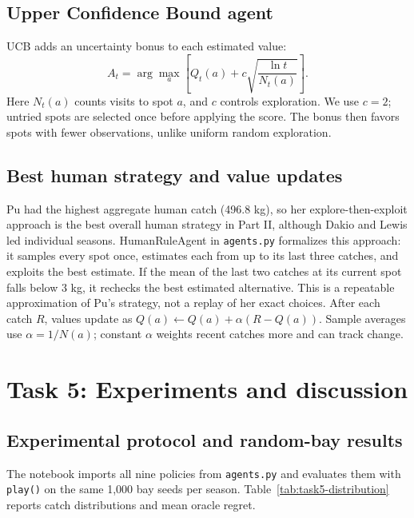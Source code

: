 \documentclass[11pt,a4paper]{article}
\begin{document}
\subsection{Upper Confidence Bound agent}
UCB adds an uncertainty bonus to each estimated value:
\[
A_t=\arg\max_a\left[Q_t(a)+c\sqrt{\frac{\ln t}{N_t(a)}}\right].
\]
Here $N_t(a)$ counts visits to spot $a$, and $c$ controls exploration. We use $c=2$; untried spots are selected once before applying the score. The bonus then favors spots with fewer observations, unlike uniform random exploration.

\subsection{Best human strategy and value updates}
Pu had the highest aggregate human catch (496.8 kg), so her explore-then-exploit approach is the best overall human strategy in Part II, although Dakio and Lewis led individual seasons. HumanRuleAgent in \texttt{agents.py} formalizes this approach: it samples every spot once, estimates each from up to its last three catches, and exploits the best estimate. If the mean of the last two catches at its current spot falls below 3 kg, it rechecks the best estimated alternative. This is a repeatable approximation of Pu's strategy, not a replay of her exact choices. After each catch $R$, values update as $Q(a)\leftarrow Q(a)+\alpha(R-Q(a))$. Sample averages use $\alpha=1/N(a)$; constant $\alpha$ weights recent catches more and can track change.

\section{Task 5: Experiments and discussion}
\subsection{Experimental protocol and random-bay results}
The notebook imports all nine policies from \texttt{agents.py} and evaluates them with \texttt{play()} on the same 1,000 bay seeds per season. Table~\ref{tab:task5-distribution} reports catch distributions and mean oracle regret.
\end{document}
